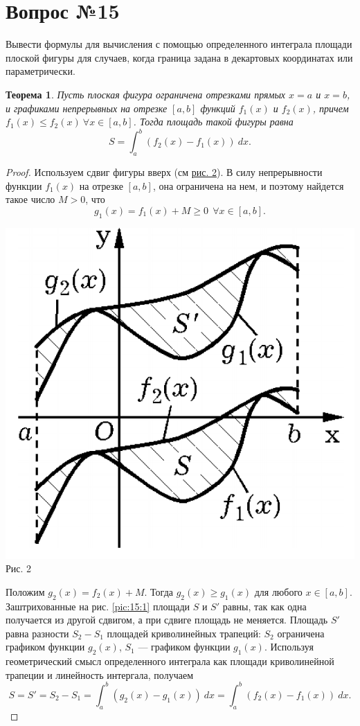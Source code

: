 \documentclass[12pt]{report}
\numberwithin{equation}{section}
\newtheorem{theorem}{Теорема}[section]
\begin{document}
\newpage \section{Вопрос №15} %
\begin{framed}
Вывести формулы для вычисления с помощью определенного интеграла площади плоской
фигуры для случаев, когда граница задана в декартовых координатах или параметрически.
\end{framed}

\begin{theorem} \label{th:15:1}
 Пусть плоская фигура ограничена отрезками прямых $x = a$ и $x = b$, и графиками непрерывных на отрезке $[a,b]$ функций $f_1(x)$ и $f_2(x)$, причем $f_1(x) \leqslant f_2(x)~ \forall x \in [a,b]$. Тогда площадь такой фигуры равна
\[S = \int_a^b (f_2(x) - f_1(x))~dx. \]
\end{theorem}
\begin{proof}
Используем сдвиг фигуры вверх (см \hyperref[pic:15:1]{рис. 2}). В силу непрерывности функции $f_1(x)$ на отрезке $[a,b]$, она ограничена на нем, и поэтому найдется такое число $M > 0$, что 
\[ g_1(x) = f_1(x) + M \geqslant 0 ~~ \forall x \in [a,b].\]

\begin{center}
\includegraphics[scale=0.2]{pic15_1.png} \label{pic:15:1}\\
Рис. 2
\end{center}

Положим $g_2(x) = f_2(x) + M$. Тогда $g_2(x) \geqslant g_1(x)$ для любого $x \in [a,b]$. Заштрихованные на рис. \ref{pic:15:1} площади $S$ и $S'$ равны, так как одна получается из другой сдвигом, а при сдвиге площадь не меняется. Площадь $S'$ равна разности $S_2 - S_1$ площадей криволинейных трапеций: $S_2$ ограничена графиком функции $g_2(x)$, $S_1$ --- графиком функции $g_1(x)$. Используя геометрический смысл определенного интеграла как площади криволинейной трапеции и линейность интергала, получаем
\[ S = S' = S_2 - S_1 = \int_a^b (g_2(x) - g_1(x)) ~dx = \int_a^b (f_2(x) - f_1(x)) ~dx.\]
\end{proof}
\end{document}
